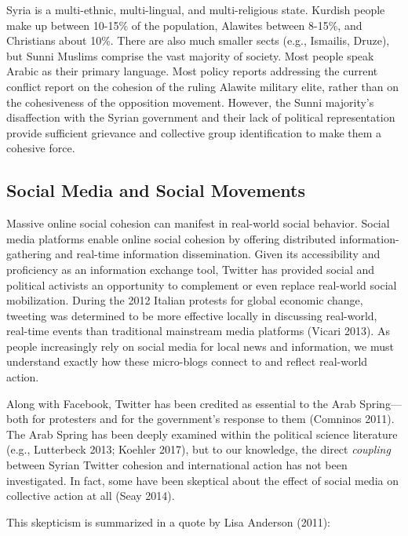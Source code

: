 \documentclass[
  english,
  man]{apa6}
\begin{document}
Syria is a multi-ethnic, multi-lingual, and multi-religious state. Kurdish
people make up between 10-15\% of the population, Alawites between 8-15\%, and
Christians about 10\%. There are also much smaller sects (e.g., Ismailis, Druze),
but Sunni Muslims comprise the vast majority of society. Most people speak
Arabic as their primary language. Most policy reports addressing the current
conflict report on the cohesion of the ruling Alawite military elite, rather
than on the cohesiveness of the opposition movement. However, the Sunni
majority's disaffection with the Syrian government and their lack of political
representation provide sufficient grievance and collective group identification
to make them a cohesive force.

\hypertarget{social-media-and-social-movements}{%
\subsection{Social Media and Social Movements}\label{social-media-and-social-movements}}

Massive online social cohesion can manifest in real-world social behavior.
Social media platforms enable online social cohesion by offering distributed
information-gathering and real-time information dissemination. Given its
accessibility and proficiency as an information exchange tool, Twitter has
provided social and political activists an opportunity to complement or even
replace real-world social mobilization. During the 2012 Italian protests for
global economic change, tweeting was determined to be more effective locally in
discussing real-world, real-time events than traditional mainstream media
platforms (Vicari 2013). As people increasingly rely on social media for
local news and information, we must understand exactly how these micro-blogs
connect to and reflect real-world action.

Along with Facebook, Twitter has been credited as essential to the Arab
Spring---both for protesters and for the government's response to them
(Comninos 2011). The Arab Spring has been deeply examined within the
political science literature (e.g., Lutterbeck 2013; Koehler 2017), but to our knowledge, the direct \emph{coupling} between
Syrian Twitter cohesion and international action has not been investigated. In
fact, some have been skeptical about the effect of social media on collective
action at all (Seay 2014).

This skepticism is summarized in a quote by Lisa Anderson (2011):
\end{document}
